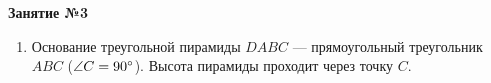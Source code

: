 \documentclass[12pt, a4paper]{article}
\begin{document}
	
   \cfoot{}
\begin{center}
	\Large
	\textbf{Занятие №3}
\end{center}
\begin{enumerate}[label=\textbf{\arabic*.}]
	\item Основание треугольной пирамиды $DABC$ --- прямоугольный треугольник $ABC$ ($\angle C = 90\degree$). Высота пирамиды проходит через точку $C$.
\end{enumerate}
\end{document}
